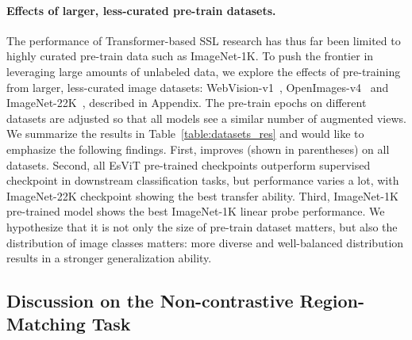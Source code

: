 \documentclass{article} \usepackage{iclr2022_conference,times}
\newcommand{\shortname}{EsViT}
\begin{document}
\paragraph{Effects of larger, less-curated pre-train datasets.}
The performance of Transformer-based SSL research has thus far been limited to highly curated pre-train data such as ImageNet-1K. To push the frontier in leveraging large amounts of unlabeled data, we explore the effects of pre-training from larger, less-curated image datasets:  
WebVision-v1~\citep{li2017webvision}, OpenImages-v4~\citep{kuznetsova2020open} and ImageNet-22K~\citep{deng2009imagenet}, described in Appendix. The pre-train epochs on different datasets are adjusted so that all models see a similar number of augmented views. 
We summarize the results in Table~\ref{table:datasets_res} and would like to emphasize the following findings.
First,  improves  (shown in parentheses) on all datasets.
Second, all \shortname{} pre-trained checkpoints outperform supervised checkpoint in downstream classification tasks, but performance varies a lot, with ImageNet-22K checkpoint showing the best transfer ability. Third, ImageNet-1K pre-trained model shows the best ImageNet-1K linear probe performance. 
We hypothesize that it is not only the size of pre-train dataset matters, but also the distribution of image classes matters: more diverse and well-balanced distribution results in a stronger generalization ability. 









\vspace{-2mm}
\subsection{Discussion on the Non-contrastive Region-Matching Task}
\vspace{-2mm}
\end{document}
